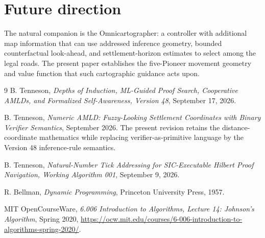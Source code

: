 \documentclass[11pt]{article}
\theoremstyle{remark}
\begin{document}
\section*{Future direction}
The natural companion is the Omnicartographer: a controller with additional map information that can use addressed inference geometry, bounded counterfactual look-ahead, and settlement-horizon estimates to select among the legal roads. The present paper establishes the five-Pioneer movement geometry and value function that such cartographic guidance acts upon.

\begin{thebibliography}{9}
B. Tenneson,
\emph{Depths of Induction, ML-Guided Proof Search, Cooperative AMLDs, and Formalized Self-Awareness, Version 48},
September 17, 2026.

B. Tenneson,
\emph{Numeric AMLD: Fuzzy-Looking Settlement Coordinates with Binary Verifier Semantics},
September 2026. The present revision retains the distance-coordinate mathematics while replacing verifier-as-primitive language by the Version 48 inference-rule semantics.

B. Tenneson,
\emph{Natural-Number Tick Addressing for SIC-Executable Hilbert Proof Navigation, Working Algorithm 001},
September 9, 2026.

R. Bellman,
\emph{Dynamic Programming},
Princeton University Press, 1957.

MIT OpenCourseWare,
\emph{6.006 Introduction to Algorithms, Lecture 14: Johnson's Algorithm},
Spring 2020,
\url{https://ocw.mit.edu/courses/6-006-introduction-to-algorithms-spring-2020/}.
\end{thebibliography}
\end{document}

